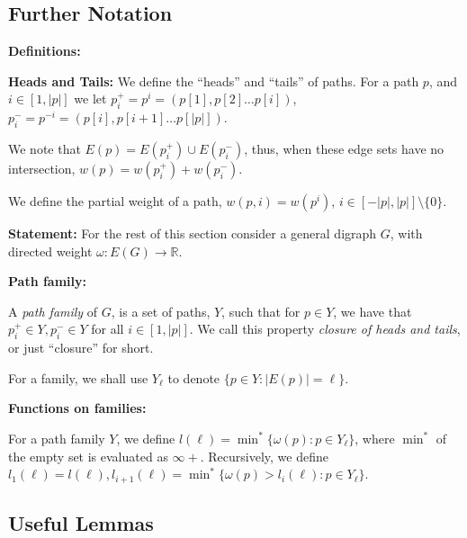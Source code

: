 \documentclass{article}
\newcommand{\edit}[1]{}%
\newcommand{\rough}[1]{}%
\begin{document}
\subsection{Further Notation} \label{notation}

\textbf{Definitions:}

\textbf{Heads and Tails:} We define the ``heads'' and ``tails'' of paths. For a path $p$, and $i \in [1,|p|]$ we let $p_i^+ = p^i = (p[1],p[2]\dots p[i])$, $p_i^- = p^{-i} = (p[i], p[i+1]\dots p[|p|])$.\edit{ second form maybe more confusing than useful}


We note that $E(p) = E(p_i^+)\cup E(p_i^-)$, thus, when these edge sets have no intersection, $w(p) = w(p_i^+)+w(p_i^-)$.\edit{ this clarification feels distracting, maybe define $E(p)$ as a multiset?}

We define the partial weight of a path, $w(p,i) = w(p^i)$, $i \in [-|p|,|p|] \setminus \{0\} $.

\vspace{1.75em}

\textbf{Statement:} For the rest of this section consider a general digraph $G$, with directed weight $\omega: E(G) \to \mathbb{R}$.\edit{ awkward transition of generality, I use $w$ in previous definitions but am using $\omega$ now...}

\vspace{1.75em}

\textbf{Path family:} 

A \textit{path family} of $G$, is a set of paths, $Y$, such that for $p \in Y$, we have that $p_i^+ \in Y,p_i^- \in Y$ for all $i \in [1,|p|]$. We call this property \textit{closure of heads and tails}, or just ``closure'' for short. 

For a family, we shall use $Y_\ell$ to denote $\{ p \in Y : |E(p)| = \ell\}$.

\vspace{1.75em}

\textbf{Functions on families:}

For a path family $Y$, we define $l(\ell) =  \min^*\{\omega(p): p \in Y_\ell\}$, where $\min^*$ of the empty set is evaluated as $\infty +$. Recursively, we define $l_1(\ell) = l(\ell), l_{i+1}(\ell) = \min^*\{ \omega(p) > l_i(\ell): p \in Y_\ell\}$.\edit{ decide whether I'm cool letting $Y$ be implicit}

\rough{NOT DONE WITH BELOW SECTION}

\subsection{Useful Lemmas} \label{lemmas}
\end{document}
